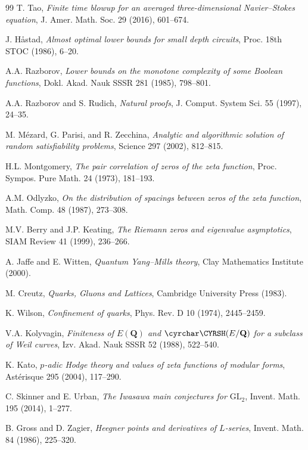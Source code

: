 \documentclass[11pt]{article}
\begin{document}
\begin{thebibliography}{99}
T. Tao, \emph{Finite time blowup for an averaged three-dimensional
Navier--Stokes equation}, J. Amer. Math. Soc. 29 (2016), 601--674.

J. H\aa stad, \emph{Almost optimal lower bounds for small depth
circuits}, Proc. 18th STOC (1986), 6--20.

A.A. Razborov, \emph{Lower bounds on the monotone complexity of some
Boolean functions}, Dokl. Akad. Nauk SSSR 281 (1985), 798--801.

A.A. Razborov and S. Rudich, \emph{Natural proofs},
J. Comput. System Sci. 55 (1997), 24--35.

M. M\'ezard, G. Parisi, and R. Zecchina, \emph{Analytic and
algorithmic solution of random satisfiability problems},
Science 297 (2002), 812--815.

H.L. Montgomery, \emph{The pair correlation of zeros of the zeta
function}, Proc. Sympos. Pure Math. 24 (1973), 181--193.

A.M. Odlyzko, \emph{On the distribution of spacings between zeros of
the zeta function}, Math. Comp. 48 (1987), 273--308.

M.V. Berry and J.P. Keating, \emph{The Riemann zeros and eigenvalue
asymptotics}, SIAM Review 41 (1999), 236--266.

A. Jaffe and E. Witten, \emph{Quantum Yang--Mills theory},
Clay Mathematics Institute (2000).

M. Creutz, \emph{Quarks, Gluons and Lattices},
Cambridge University Press (1983).

K. Wilson, \emph{Confinement of quarks},
Phys. Rev. D 10 (1974), 2445--2459.

V.A. Kolyvagin, \emph{Finiteness of $E(\mathbf{Q})$ and
$\text{\cyrchar\CYRSH}(E/\mathbf{Q})$ for a subclass of Weil curves},
Izv. Akad. Nauk SSSR 52 (1988), 522--540.

K. Kato, \emph{$p$-adic Hodge theory and values of zeta functions of
modular forms}, Ast\'erisque 295 (2004), 117--290.

C. Skinner and E. Urban, \emph{The Iwasawa main conjectures for
$\mathrm{GL}_2$}, Invent. Math. 195 (2014), 1--277.

B. Gross and D. Zagier, \emph{Heegner points and derivatives of
$L$-series}, Invent. Math. 84 (1986), 225--320.


\end{thebibliography}
\end{document}
